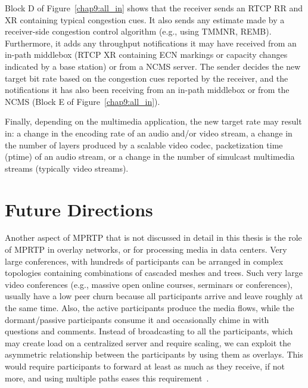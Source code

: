 Block D of Figure~\ref{chap9:all_in} shows that the receiver sends an RTCP
RR and XR containing typical congestion cues. It also sends any estimate made
by a receiver-side congestion control algorithm (e.g., using TMMNR, REMB).
Furthermore, it adds any throughput notifications it may have received from an
in-path middlebox (RTCP XR containing ECN markings or capacity changes
indicated by a base station) or from a NCMS server. The sender decides the new
target bit rate based on the congestion cues reported by the receiver, and the
notifications it has also been receiving from an in-path middlebox or from the
NCMS (Block E of Figure~\ref{chap9:all_in}).


Finally, depending on the multimedia application, the new target rate may
result in: a change in the encoding rate of an audio and/or video stream, a
change in the number of layers produced by a scalable video codec,
packetization time (ptime) of an audio stream, or a change in the number of
simulcast multimedia streams (typically video streams).

\section{Future Directions}

Another aspect of MPRTP that is not discussed in detail in this thesis is the
role of MPRTP in overlay networks, or for processing media in data centers. Very
large conferences, with hundreds of participants can be arranged in complex
topologies containing combinations of cascaded meshes and trees. Such very
large video conferences (e.g., massive open online courses, serminars or
conferences), usually have a low peer churn because all participants arrive
and leave roughly at the same time. Also, the active participants produce the
media flows, while the dormant/passive participants consume it and occasionally
chime in with questions and comments. Instead of broadcasting to all the
participants, which may create load on a centralized server and require
scaling, we can exploit the asymmetric relationship between the participants
by using them as overlays. This would require participants to forward at least
as much as they receive, if not more, and using multiple paths eases this
requirement~\cite{Noh2008,Li2010a,Globisch:AsymGrpComm}.



